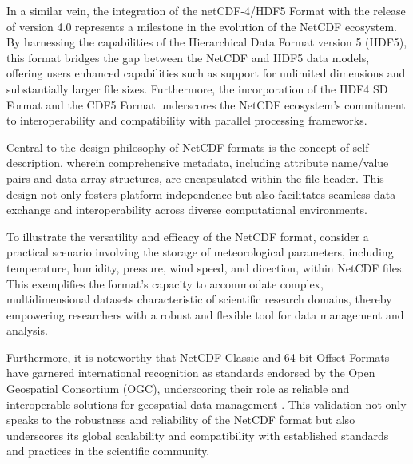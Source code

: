 In a similar vein, the integration of the netCDF-4/HDF5 Format with the release
of version 4.0 represents a milestone in the evolution of the NetCDF ecosystem.
By harnessing the capabilities of the Hierarchical Data Format version 5 (HDF5),
this format bridges the gap between the NetCDF and HDF5 data models, offering
users enhanced capabilities such as support for unlimited dimensions and
substantially larger file sizes. Furthermore, the incorporation of the HDF4 SD
Format and the CDF5 Format underscores the NetCDF ecosystem's commitment to
interoperability and compatibility with parallel processing frameworks.

Central to the design philosophy of NetCDF formats is the concept of
self-description, wherein comprehensive metadata, including attribute name/value
pairs and data array structures, are encapsulated within the file header. This
design not only fosters platform independence but also facilitates seamless data
exchange and interoperability across diverse computational environments.

To illustrate the versatility and efficacy of the NetCDF format, consider a
practical scenario involving the storage of meteorological parameters, including
temperature, humidity, pressure, wind speed, and direction, within NetCDF files.
This exemplifies the format's capacity to accommodate complex, multidimensional
datasets characteristic of scientific research domains, thereby empowering
researchers with a robust and flexible tool for data management and analysis.


Furthermore, it is noteworthy that NetCDF Classic and 64-bit Offset Formats have
garnered international recognition as standards endorsed by the Open Geospatial
Consortium (OGC), underscoring their role as reliable and interoperable
solutions for geospatial data management \cite{ogcnetcdf}. This validation not
only speaks to the robustness and reliability of the NetCDF format but also
underscores its global scalability and compatibility with established standards
and practices in the scientific community.